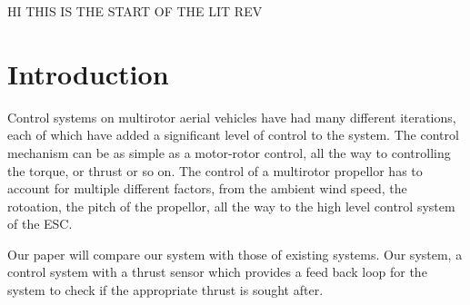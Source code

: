 \documentclass{article}
\begin{document}
HI THIS IS THE START OF THE LIT REV
\section{Introduction}

Control systems on multirotor aerial vehicles have had many different iterations, each of which have added a significant level of control to the system. The control mechanism can be as simple as a motor-rotor control, all the way to controlling the torque, or thrust or so on. The control of a multirotor propellor has to account for multiple different factors, from the ambient wind speed, the rotoation, the pitch of the propellor, all the way to the high level control system of the ESC. 

Our paper will compare our system with those of existing systems. 
Our system, a control system with a thrust sensor which provides a feed back loop for the system to check if the appropriate thrust is sought after. 
\end{document}
